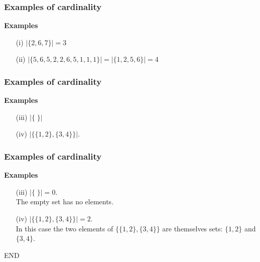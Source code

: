 \documentclass{beamer}
\begin{document}
\begin{frame}
\frametitle{Examples of cardinality}
\LARGE
\vspace{-1cm}
\textbf{Examples}
\begin{itemize}
\item[(i)] $|\{2,6,7\}| = 3$
\vspace{2cm}
\item[(ii)] $|\{5,6,5,2,2,6,5,1,1,1\}| = |\{1,2,5,6\}| = 4$
\end{itemize}
\end{frame}
\begin{frame}
\frametitle{Examples of cardinality}
\LARGE
\vspace{-1cm}
\textbf{Examples}
\begin{itemize}
\item[(iii)] $|\{ \; \}| $
\vspace{2cm}
\item[(iv)] $|\{\{1,2\},\{3,4\}\}| $.
\end{itemize}
\end{frame}

\begin{frame}
\frametitle{Examples of cardinality}
\LARGE
\vspace{-1cm}
\textbf{Examples}
\begin{itemize}
\item[(iii)] $|\{ \; \}| = 0$. \\ The empty set has no elements.
\vspace{0.4cm} 
\item[(iv)] $|\{\{1,2\},\{3,4\}\}| = 2$. \\ \vspace{0.4cm} In this case the two elements of $\{\{1,2\},\{3,4\}\}$ are themselves sets: $\{1,2\}$ and $\{3,4\}$.
\end{itemize}
\end{frame}
\begin{frame}
END
\end{frame}
\end{document}
